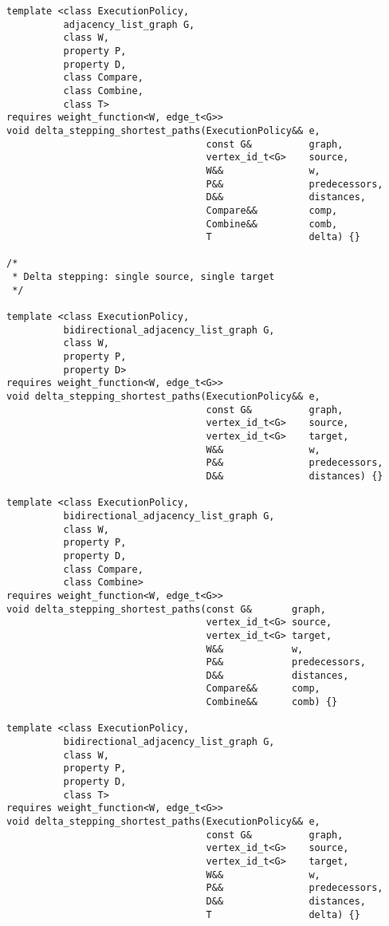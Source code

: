 \begin{lstlisting}
template <class ExecutionPolicy,
          adjacency_list_graph G,
          class W,
          property P,
          property D,
          class Compare,
          class Combine,
          class T>
requires weight_function<W, edge_t<G>>
void delta_stepping_shortest_paths(ExecutionPolicy&& e,
                                   const G&          graph,
                                   vertex_id_t<G>    source,
                                   W&&               w,
                                   P&&               predecessors,
                                   D&&               distances,
                                   Compare&&         comp,
                                   Combine&&         comb,
                                   T                 delta) {}

/*
 * Delta stepping: single source, single target
 */

template <class ExecutionPolicy,
          bidirectional_adjacency_list_graph G,
          class W,
          property P,
          property D>
requires weight_function<W, edge_t<G>>
void delta_stepping_shortest_paths(ExecutionPolicy&& e,
                                   const G&          graph,
                                   vertex_id_t<G>    source,
                                   vertex_id_t<G>    target,
                                   W&&               w,
                                   P&&               predecessors,
                                   D&&               distances) {}

template <class ExecutionPolicy,
          bidirectional_adjacency_list_graph G,
          class W,
          property P,
          property D,
          class Compare,
          class Combine>
requires weight_function<W, edge_t<G>>
void delta_stepping_shortest_paths(const G&       graph,
                                   vertex_id_t<G> source,
                                   vertex_id_t<G> target,
                                   W&&            w,
                                   P&&            predecessors,
                                   D&&            distances,
                                   Compare&&      comp,
                                   Combine&&      comb) {}

template <class ExecutionPolicy,
          bidirectional_adjacency_list_graph G,
          class W,
          property P,
          property D,
          class T>
requires weight_function<W, edge_t<G>>
void delta_stepping_shortest_paths(ExecutionPolicy&& e,
                                   const G&          graph,
                                   vertex_id_t<G>    source,
                                   vertex_id_t<G>    target,
                                   W&&               w,
                                   P&&               predecessors,
                                   D&&               distances,
                                   T                 delta) {}


\end{lstlisting}
